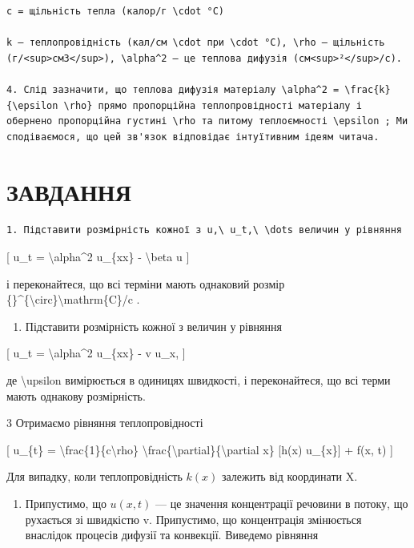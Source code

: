 \documentclass[
]{article}
\providecommand{\tightlist}{%
  \setlength{\itemsep}{0pt}\setlength{\parskip}{0pt}}
\begin{document}
\begin{verbatim}
c = щільність тепла (калор/г \cdot °C)

k — теплопровідність (кал/см \cdot при \cdot °C), \rho — щільність (г/<sup>см3</sup>), \alpha^2 — це теплова дифузія (см<sup>²</sup>/с).

4. Слід зазначити, що теплова дифузія матеріалу \alpha^2 = \frac{k}{\epsilon \rho} прямо пропорційна теплопровідності матеріалу і обернено пропорційна густині \rho та питому теплоємності \epsilon ; Ми сподіваємося, що цей зв'язок відповідає інтуїтивним ідеям читача.
\end{verbatim}

\section{ЗАВДАННЯ}\label{ux437ux430ux432ux434ux430ux43dux43dux44f-2}

\begin{verbatim}
1. Підставити розмірність кожної з u,\ u_t,\ \dots величин у рівняння
\end{verbatim}

{[} u\_t = \textbackslash alpha\^{}2 u\_\{xx\} - \textbackslash beta u
{]}

і переконайтеся, що всі терміни мають однаковий розмір
\{\}\^{}\{\textbackslash circ\}\textbackslash mathrm\{C\}/c .

\begin{enumerate}
\def\labelenumi{\arabic{enumi}.}
\setcounter{enumi}{1}
\tightlist
\item
  Підставити розмірність кожної з величин у рівняння
\end{enumerate}

{[} u\_t = \textbackslash alpha\^{}2 u\_\{xx\} - v u\_x, {]}

де \textbackslash upsilon вимірюється в одиницях швидкості, і
переконайтеся, що всі терми мають однакову розмірність.

3 Отримаємо рівняння теплопровідності

{[} u\_\{t\} = \textbackslash frac\{1\}\{c\textbackslash rho\}
\textbackslash frac\{\textbackslash partial\}\{\textbackslash partial
x\} {[}h(x) u\_\{x\}{]} + f(x, t) {]}

Для випадку, коли теплопровідність \(k\left( x\right)\) залежить від
координати X.

\begin{enumerate}
\def\labelenumi{\arabic{enumi}.}
\setcounter{enumi}{3}
\tightlist
\item
  Припустимо, що \(u(x, t)\) --- це значення концентрації речовини в
  потоку, що рухається зі швидкістю v. Припустимо, що концентрація
  змінюється внаслідок процесів дифузії та конвекції. Виведемо рівняння
\end{enumerate}
\end{document}
